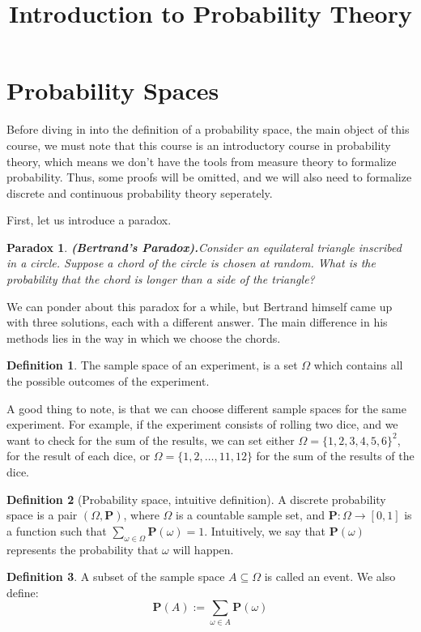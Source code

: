 \documentclass[11pt,a4paper]{article}
\title{\textbf{Introduction to Probability Theory}}
\author{}
\date{}
\theoremstyle{definition}
\newtheorem{definition}{Definition}[section]
\theoremstyle{plain}
\newtheorem{paradox}{Paradox}[section]
\newcommand{\Prob}{\mathbf{P}}
\renewcommand{\tt}[1]{\textnormal{\textbf{(#1).}}} %
\begin{document}
	\maketitle
	\newpage
  \section{Probability Spaces}
  Before diving in into the definition of a probability space, the main object
  of this course, we must note that this course is an introductory course in 
  probability theory, which means we don't have the tools from measure theory
  to formalize probability. Thus, some proofs will be omitted, and we will
  also need to formalize discrete and continuous probability theory seperately.

  First, let us introduce a paradox.
  \begin{paradox}
    \tt{Bertrand's Paradox}\label{par:ber}
    Consider an equilateral triangle inscribed in a circle. 
    Suppose a chord of the circle is chosen at random. 
    What is the probability that the chord is longer than a side of the 
    triangle? 
  \end{paradox}

  We can ponder about this paradox for a while, but Bertrand himself came up
  with three solutions, each with a different answer. The main difference in
  his methods lies in the way in which we choose the chords.

  \begin{definition}
    The sample space of an experiment, is a set $\Omega$ which contains all
    the possible outcomes of the experiment.
  \end{definition}

  A good thing to note, is that we can choose different sample spaces for the
  same experiment. For example, if the experiment consists of rolling two
  dice, and we want to check for the sum of the results, we can set either
  $\Omega = \{1,2,3,4,5,6\}^2$, for the result of each dice, or 
  $\Omega = \{1,2,\dots,11,12\}$ for the sum of the results of the dice. 

  \begin{definition}[Probability space, intuitive definition]
    A discrete probability space is a pair $(\Omega, \Prob)$, where
    $\Omega$ is a countable sample set, and $\Prob \colon \Omega \to 
    [0,1]$ is a function such that 
    $\sum_{\omega \in \Omega}{\Prob(\omega)} = 1$. 
    Intuitively, we say that $\Prob(\omega)$ represents the probability
    that $\omega$ will happen.
  \end{definition}
  \begin{definition}
    A subset of the sample space $A \subseteq \Omega$ is called an event.
    We also define:
    \[
      \Prob(A) := \sum_{\omega \in A}{\Prob(\omega)}
    \]
  \end{definition}
  
\end{document}
